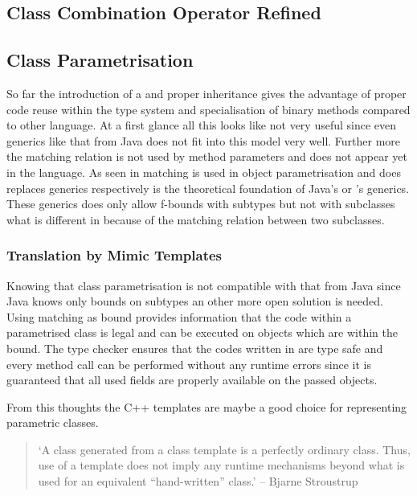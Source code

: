
\subsection{Class Combination Operator Refined}

\subsection{Class Parametrisation}
So far the introduction of a \mytype and proper inheritance gives the
advantage of proper code reuse within the type system and specialisation
of binary methods compared to other language. At a first glance all this
looks like not very useful since even generics like that from Java does
not fit into this model very well. Further more the matching relation is
not used by method parameters and does not appear yet in the language. As
seen in  matching is used in object
parametrisation and does replaces generics respectively is the theoretical
foundation of Java's or \cs's generics.  These generics does only allow
f-bounds with subtypes but not with subclasses what is different in
\ooplss because of the matching relation between two subclasses.

\subsubsection{Translation by Mimic Templates}
Knowing that \ooplss class parametrisation is not compatible with that
from Java since Java knows only bounds on subtypes an other more open
solution is needed.  Using matching as bound provides information that
the code within a parametrised class is legal and can be executed on
objects which are within the bound. The type checker ensures that the
codes written in \ooplss are type safe and every method call can be
performed without any runtime errors since it is guaranteed that all
used fields are properly available on the passed objects.

From this thoughts the C++ templates are maybe a good choice for
representing parametric classes.

\begin{quotation}
`A class generated from a class template is a perfectly ordinary
class. Thus, use of a template does not imply any runtime mechanisms
beyond what is used for an equivalent ``hand-written'' class.' -- Bjarne
Stroustrup \cite{stroustrup_c++_2000}
\end{quotation}

